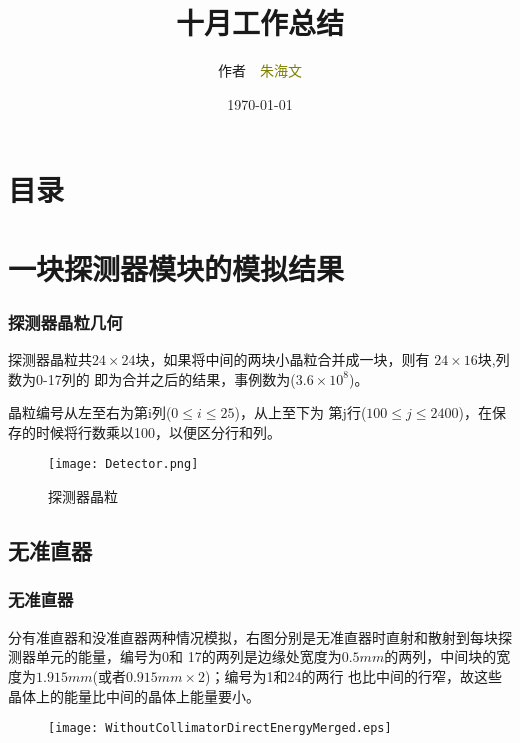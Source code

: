 \documentclass{beamer}
\begin{document}
\begin{CJK*}{UTF8}{gkai}
  \title{十月工作总结}
  \author[\textcolor{black}{作者 朱海文}]{作者~~\textcolor{olive}{朱海文}}
  \institute{\textcolor{violet}{摩科特医疗器械有限公司}}
  \date{\today}
  \frame{\titlepage}
  \section*{目录}
  \section{一块探测器模块的模拟结果}
  \begin{frame}\frametitle{探测器晶粒几何}
    \begin{minipage}[t]{0.3\textwidth}
      \liuhao
      探测器晶粒共$24\times24$块，如果将中间的两块小晶粒合并成一块，则有
      $24\times16$块,列数为0-17列的
      即为合并之后的结果，事例数为($3.6\times10^8$)。
      
      晶粒编号从左至右为第i列($0\leq i \leq 25$)，从上至下为
      第j行($100\le j \le2400$)，在保存的时候将行数乘以100，以便区分行和列。
    \end{minipage}
    \begin{minipage}[t]{0.7\textwidth}
      \begin{figure}[ht]
	\centering
        \texttt{[image: Detector.png]}
	\caption{\liuhao 探测器晶粒}
	\label{Detector}
      \end{figure}
    \end{minipage}
  \end{frame}
  \subsection{无准直器}
  \begin{frame}\frametitle{无准直器}
    \begin{minipage}[t]{0.3\textwidth}
      \liuhao
      分有准直器和没准直器两种情况模拟，右图分别是无准直器时直射和散射到每块探测器单元的能量，编号为0和
      17的两列是边缘处宽度为$0.5mm$的两列，中间块的宽度为$1.915mm$(或者$0.915mm\times 2$)；编号为1和24的两行
      也比中间的行窄，故这些晶体上的能量比中间的晶体上能量要小。
    \end{minipage}
    \begin{minipage}[t]{0.7\textwidth}
      \vskip -0.5cm
      \begin{figure}[ht]
        \centering
        \texttt{[image: WithoutCollimatorDirectEnergyMerged.eps]}


\end{figure}
\end{minipage}
\end{frame}
\end{CJK*}
\end{document}
